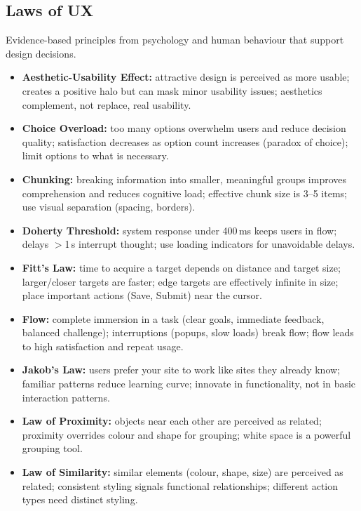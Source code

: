 \documentclass[hidelinks]{article}
\begin{document}
\subsection{Laws of UX}
Evidence-based principles from psychology and human behaviour that support design decisions.
\begin{itemize}
  \item \textbf{Aesthetic-Usability Effect:} attractive design is perceived as more usable; creates a
        positive halo but can mask minor usability issues; aesthetics complement, not replace, real
        usability.
  \item \textbf{Choice Overload:} too many options overwhelm users and reduce decision quality;
        satisfaction decreases as option count increases (paradox of choice); limit options to what is
        necessary.
  \item \textbf{Chunking:} breaking information into smaller, meaningful groups improves comprehension
        and reduces cognitive load; effective chunk size is 3--5 items; use visual separation (spacing,
        borders).
  \item \textbf{Doherty Threshold:} system response under 400\,ms keeps users in flow; delays $>$1\,s
        interrupt thought; use loading indicators for unavoidable delays.
  \item \textbf{Fitt's Law:} time to acquire a target depends on distance and target size; larger/closer
        targets are faster; edge targets are effectively infinite in size; place important actions
        (Save, Submit) near the cursor.
  \item \textbf{Flow:} complete immersion in a task (clear goals, immediate feedback, balanced
        challenge); interruptions (popups, slow loads) break flow; flow leads to high satisfaction and
        repeat usage.
  \item \textbf{Jakob's Law:} users prefer your site to work like sites they already know; familiar
        patterns reduce learning curve; innovate in functionality, not in basic interaction patterns.
  \item \textbf{Law of Proximity:} objects near each other are perceived as related; proximity overrides
        colour and shape for grouping; white space is a powerful grouping tool.
  \item \textbf{Law of Similarity:} similar elements (colour, shape, size) are perceived as related;
        consistent styling signals functional relationships; different action types need distinct styling.
\end{itemize}
\end{document}
